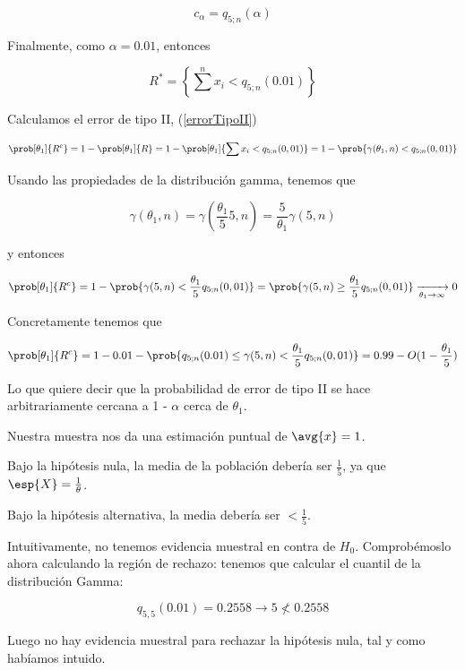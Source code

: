 \begin{problem}[1]
\[ c_\alpha = q_{5; n}(\alpha) \]

Finalmente, como $\alpha = 0.01 $, entonces

\[
R^{\ast} = \left\{ \sum\limits^n x_i < q_{5; n}(0.01) \right\}
\]

\spart Calculamos el error de tipo II, (\ref{errorTipoII})

\[
\prob[\theta_1]{R^c} =
1 - \prob[\theta_1]{R} =
1 - \prob[\theta_1]{\sum x_i < q_{5; n}(0,01)} =
1 - \prob{\gamma(\theta_1, n) < q_{5; n}(0,01)}
\]

Usando las propiedades de la distribución gamma, tenemos que

\[
\gamma(\theta_1, n) =
\gamma\left(\frac{\theta_1}{5}5, n\right) =
\frac{5}{\theta_1}\gamma(5, n)
\]

y entonces

\[
\prob[\theta_1]{R^c} =
1 - \prob{\gamma(5, n) < \frac{\theta_1}{5}q_{5; n}(0,01)} =
\prob{\gamma(5, n)\geq \frac{\theta_1}{5}q_{5; n} (0,01)}
\xrightarrow[\theta_1 \to \infty]{} 0
\]

Concretamente tenemos que

\[
\prob[\theta_1]{R^c} =
1 - 0.01 - \prob{q_{5; n}(0.01) \leq \gamma(5, n) < \frac{\theta_1}{5}q_{5; n} (0,01)} =
0.99 - O(1 - \frac{\theta_1}{5})
\]

Lo que quiere decir que la probabilidad de error de tipo II se hace arbitrariamente cercana a 1 - $\alpha$ cerca de $\theta_1$.

\spart Nuestra muestra nos da una estimación puntual de $\avg{x} = 1$.

\noindent Bajo la hipótesis nula, la media de la población debería ser $\frac{1}{5}$, ya que $\esp{X} = \frac{1}{\theta}$.

\noindent Bajo la hipótesis alternativa, la media debería ser $ < \frac{1}{5}$.

Intuitivamente, no tenemos evidencia muestral en contra de $H_0$. Comprobémoslo ahora calculando la región de rechazo:
tenemos que calcular el cuantil de la distribución Gamma:

\[ q_{5, 5}(0.01) = 0.2558 \rightarrow 5 \nless 0.2558 \]

Luego no hay evidencia muestral para rechazar la hipótesis nula, tal y como habíamos intuido.

\end{problem}


